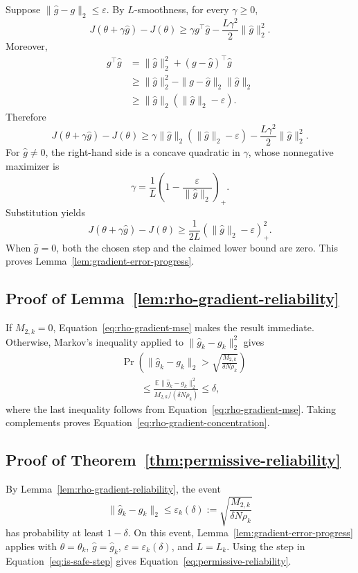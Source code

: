 \documentclass[11pt]{article}
\theoremstyle{remark}
\newcommand{\E}{\mathbb{E}}
\begin{document}
Suppose
$\|\widehat g-g\|_2\le\varepsilon$.
By $L$-smoothness, for every $\gamma\ge0$,
\[
 J(\theta+\gamma\widehat g)-J(\theta)
 \ge
 \gamma g^\top\widehat g
 -
 \frac{L\gamma^2}{2}
 \|\widehat g\|_2^2.
\]
Moreover,
\begin{align*}
 g^\top\widehat g
 &=
 \|\widehat g\|_2^2
 +(g-\widehat g)^\top\widehat g\\
 &\ge
 \|\widehat g\|_2^2
 -
 \|g-\widehat g\|_2\|\widehat g\|_2\\
 &\ge
 \|\widehat g\|_2
 \left(
 \|\widehat g\|_2-\varepsilon
 \right).
\end{align*}
Therefore
\[
 J(\theta+\gamma\widehat g)-J(\theta)
 \ge
 \gamma\|\widehat g\|_2
 \left(
 \|\widehat g\|_2-\varepsilon
 \right)
 -
 \frac{L\gamma^2}{2}\|\widehat g\|_2^2.
\]
For $\widehat g\neq0$, the right-hand side is a concave quadratic in
$\gamma$, whose nonnegative maximizer is
\[
 \gamma
 =
 \frac1L
 \left(
 1-\frac{\varepsilon}{\|\widehat g\|_2}
 \right)_+.
\]
Substitution yields
\[
 J(\theta+\gamma\widehat g)-J(\theta)
 \ge
 \frac1{2L}
 \left(
 \|\widehat g\|_2-\varepsilon
 \right)_+^2.
\]
When $\widehat g=0$, both the chosen step and the claimed lower bound are zero.
This proves Lemma~\ref{lem:gradient-error-progress}.


\subsection{Proof of Lemma~\ref{lem:rho-gradient-reliability}}

If $M_{2,k}=0$, Equation~\eqref{eq:rho-gradient-mse} makes the result
immediate. Otherwise, Markov's inequality applied to
$\|\widehat g_k-g_k\|_2^2$ gives
\begin{align*}
 &\Pr\left(
 \|\widehat g_k-g_k\|_2
 >
 \sqrt{\frac{M_{2,k}}{\delta N\rho_k}}
 \right)\\
 &\qquad\le
 \frac{
 \E\|\widehat g_k-g_k\|_2^2
 }{
 M_{2,k}/(\delta N\rho_k)
 }
 \le
 \delta,
\end{align*}
where the last inequality follows from
Equation~\eqref{eq:rho-gradient-mse}. Taking complements proves
Equation~\eqref{eq:rho-gradient-concentration}.


\subsection{Proof of Theorem~\ref{thm:permissive-reliability}}

By Lemma~\ref{lem:rho-gradient-reliability}, the event
\[
 \|\widehat g_k-g_k\|_2
 \le
 \varepsilon_k(\delta)
 :=
 \sqrt{\frac{M_{2,k}}{\delta N\rho_k}}
\]
has probability at least $1-\delta$.
On this event, Lemma~\ref{lem:gradient-error-progress} applies with
$\theta=\theta_k$, $\widehat g=\widehat g_k$,
$\varepsilon=\varepsilon_k(\delta)$, and $L=L_k$.
Using the step in Equation~\eqref{eq:is-safe-step} gives
Equation~\eqref{eq:permissive-reliability}.
\end{document}
